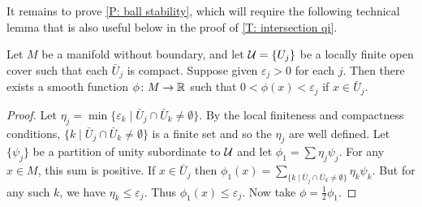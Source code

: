 \begin{comment}
	For injectivity, suppose $W \in PC^*_{\Gamma \pf X}(M)$ is transverse to the cubulation and represents zero in $H^*(C_\Gamma^*(M))$.
	Then by definition there is a $V \in PC^*_\Gamma(M)$ with $\bd V = W+T$ for some
	$T \in Q^*(M)$.
	By \cref{P: ball stability} there is a proper universal homotopy $h \colon V \times I \to M$ such that $h(-,1)$ and $h \circ (i_{W} \times \id)$ are both transverse to the cubulation.
	Let $V', W',T' \in PC^*_\Gamma(M)$ be $W$, $V$, and $T$ but with reference maps given respectively by $h(-,1)$, $h(-,1)i_W$, and $h(-,1)i_T$, where $i_W \colon W \to V$ and $i_T \colon T \to V$ are the boundary inclusion maps restricted to the components of $W$ and $T$, respectively.
	As $h \circ (i_{W} \times \id)$ is transverse to the cubulation, $W$ and $W'$ represent the same element of $H^*_{\Gamma \pf X}(M)$ by arguments analogous to the proof of \cref{C: homotopy}.
	But we also have $\bd V' = W'+T'$ with $V'$ in $C^*_{\Gamma \pf X}(M)$ and, by \cref{L: Q preservation}, $T' \in Q^*(M)$.
	So $W'$ represents $0 \in H^*(C^*_{\Gamma \pf X}(M))$.
\end{comment}


It remains to prove \cref{P: ball stability}, which will require the following technical lemma that is also useful below in the proof of \cref{T: intersection qi}.

\begin{lemma}\label{L: minimizer}
	Let $M$ be a manifold without boundary, and let $\mathcal{U} = \{U_j\}$ be a locally finite open cover such that each $\bar U_j$ is compact.
	Suppose given $\varepsilon_j>0$ for each $j$.
	Then there exists a smooth function $\phi \colon M \to \mathbb{R}$ such that $0<\phi(x)<\varepsilon_j$ if $x \in \bar U_j$.
\end{lemma}

\begin{proof}
	Let $\eta_j = \min\{\varepsilon_k \mid \bar U_j \cap \bar U_k\neq \emptyset\}$.
	By the local finiteness and compactness conditions, $\{k \mid \bar U_j \cap \bar U_k\neq \emptyset\}$ is a finite set and so the $\eta_j$ are well defined.
	Let $\{\psi_j\}$ be a partition of unity subordinate to $\mathcal{U}$ and let $\phi_1 = \sum \eta_j\psi_j$.
	For any $x \in M$, this sum is positive.
	If $x \in \bar U_j$ then $\phi_1(x) = \sum_{\{k \mid \bar U_j \cap \bar U_k\neq \emptyset\}} \eta_k\psi_k$.
	But for any such $k$, we have $\eta_k \leq \varepsilon_j$.
	Thus $\phi_1(x) \leq \varepsilon_j$.
	Now take $\phi = \frac{1}{2}\phi_1$.
\end{proof}

